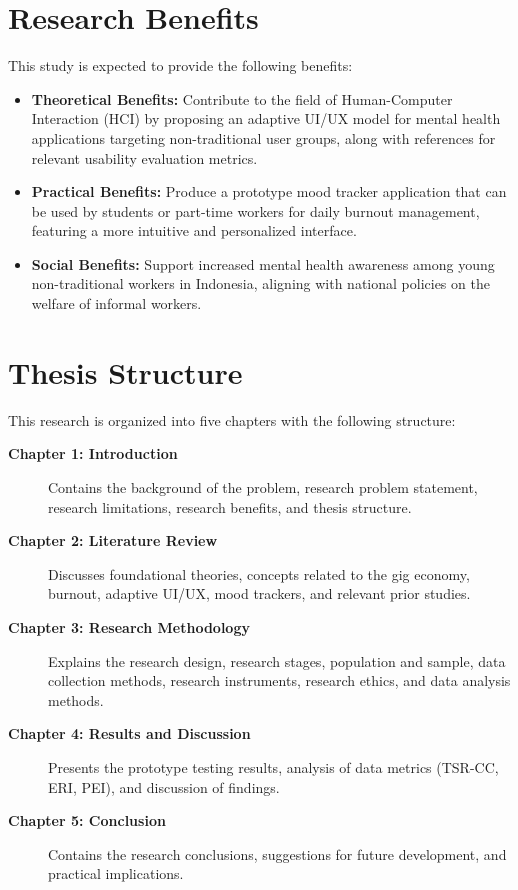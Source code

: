 \section{Research Benefits}

This study is expected to provide the following benefits:

\begin{itemize}
	\item \textbf{Theoretical Benefits:} Contribute to the field of Human-Computer Interaction (HCI) by proposing an adaptive UI/UX model for mental health applications targeting non-traditional user groups, along with references for relevant usability evaluation metrics.
	\item \textbf{Practical Benefits:} Produce a prototype mood tracker application that can be used by students or part-time workers for daily burnout management, featuring a more intuitive and personalized interface.
	\item \textbf{Social Benefits:} Support increased mental health awareness among young non-traditional workers in Indonesia, aligning with national policies on the welfare of informal workers.
\end{itemize}

\section{Thesis Structure}

This research is organized into five chapters with the following structure:

\begin{description}
	\item[\textbf{Chapter 1: Introduction}] Contains the background of the problem, research problem statement, research limitations, research benefits, and thesis structure.
	\item[\textbf{Chapter 2: Literature Review}] Discusses foundational theories, concepts related to the gig economy, burnout, adaptive UI/UX, mood trackers, and relevant prior studies.
	\item[\textbf{Chapter 3: Research Methodology}] Explains the research design, research stages, population and sample, data collection methods, research instruments, research ethics, and data analysis methods.
	\item[\textbf{Chapter 4: Results and Discussion}] Presents the prototype testing results, analysis of data metrics (TSR-CC, ERI, PEI), and discussion of findings.
	\item[\textbf{Chapter 5: Conclusion}] Contains the research conclusions, suggestions for future development, and practical implications.
\end{description}
